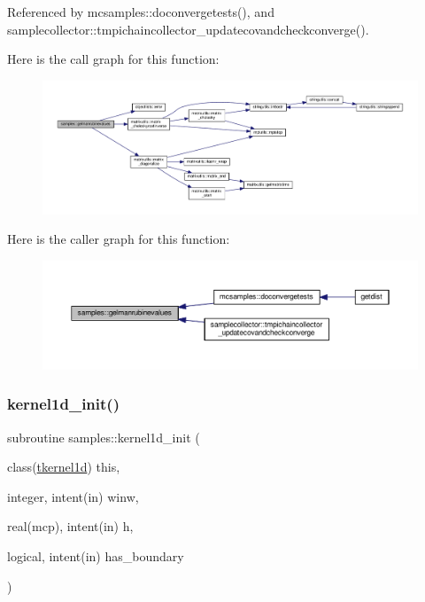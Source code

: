 Referenced by mcsamples\+::doconvergetests(), and samplecollector\+::tmpichaincollector\+\_\+updatecovandcheckconverge().

Here is the call graph for this function\+:
\nopagebreak
\begin{figure}[H]
\begin{center}
\leavevmode
\includegraphics[width=350pt]{namespacesamples_abaa5a3a56f0160fff42cc0ea3ac8a928_cgraph}
\end{center}
\end{figure}
Here is the caller graph for this function\+:
\nopagebreak
\begin{figure}[H]
\begin{center}
\leavevmode
\includegraphics[width=350pt]{namespacesamples_abaa5a3a56f0160fff42cc0ea3ac8a928_icgraph}
\end{center}
\end{figure}
\mbox{\label{namespacesamples_a34bf342dd43e661799227d0101cee393}} 
\subsubsection{\texorpdfstring{kernel1d\+\_\+init()}{kernel1d\_init()}}
{\footnotesize\ttfamily subroutine samples\+::kernel1d\+\_\+init (\begin{DoxyParamCaption}\item[{class(\mbox{\hyperlink{structsamples_1_1tkernel1d}{tkernel1d}})}]{this,  }\item[{integer, intent(in)}]{winw,  }\item[{real(mcp), intent(in)}]{h,  }\item[{logical, intent(in)}]{has\+\_\+boundary }\end{DoxyParamCaption})}

